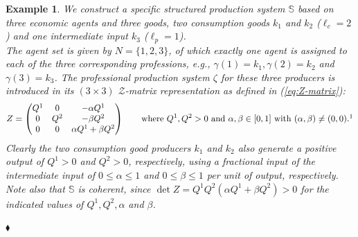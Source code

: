 \documentclass[11pt,fleqn]{article}
\newtheorem{expl}[theorem]{Example}
\newenvironment{example}{\begin{expl} \rm}{\hfill $\blacklozenge$
\end{expl}}
\begin{document}
\begin{example} \label{ex:CompleteViable}
	We construct a specific structured production system $\mathbb S$ based on three economic agents and three goods, two consumption goods $k_1$ and $k_2$ ($\ell_c =2$) and one intermediate input $k_3$ ($\ell_p =1$).
	\\
	The agent set is given by $N = \{1,2,3 \}$, of which exactly one agent is assigned to each of the three corresponding professions, e.g., $\gamma(1)=k_1, \gamma(2)=k_2$ and $\gamma(3)=k_3$. The professional production system $\zeta$ for these three producers is introduced in its $(3 \times 3)$ $\mathcal Z$-matrix representation as defined in (\ref{eq:Z-matrix}):
	\[
	Z =
	\begin{pmatrix}
	Q^1 & 0 & - \alpha Q^1 \\
	0 & Q^2 & - \beta Q^2 \\
	0 & 0 & \alpha Q^1 + \beta Q^2
	\end{pmatrix}
	\qquad \mbox{where } Q^1,Q^2 >0 \mbox{ and } \alpha , \beta \in[0,1] \mbox{ with }  (\alpha , \beta) \neq (0,0).\footnotemark
	\]
	Clearly the two consumption good producers $k_1$ and $k_2$ also generate a positive output of $Q^1>0$ and $Q^2>0$, respectively, using a fractional input of the intermediate input of $0 \leqslant \alpha \leqslant 1$ and $0 \leqslant \beta \leqslant 1$ per unit of output, respectively. 
	\\
	Note also that $\mathbb S$ is coherent, since $\det Z = Q^1Q^2 ( \alpha Q^1 + \beta Q^2) >0$ for the indicated values of $Q^1,Q^2, \alpha$ and $\beta$. 
	

\end{example}
\end{document}
